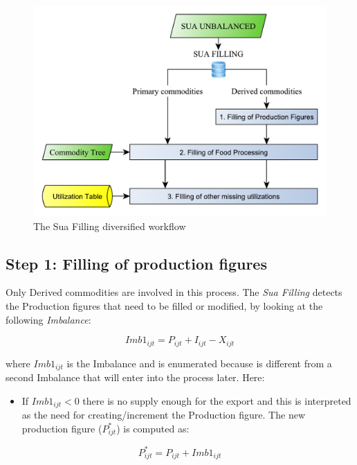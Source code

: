 \documentclass[]{article}
\providecommand{\tightlist}{%
  \setlength{\itemsep}{0pt}\setlength{\parskip}{0pt}}
\begin{document}
\begin{figure}

{\centering \includegraphics[width=0.65\linewidth]{images/StandBal/04b_SuaFilling2} 

}

\caption{\label{fig:f4}The Sua Filling diversified workflow}\label{fig:f4}
\end{figure}

\subsection*{Step 1: Filling of production
figures}\label{step-1-filling-of-production-figures}

Only Derived commodities are involved in this process. The \emph{Sua
Filling} detects the Production figures that need to be filled or
modified, by looking at the following \emph{Imbalance}:

\begin{equation}
\label{eq:imbalance1}
Imb1_{ijt} = P_{ijt} + I_{ijt} - X_{ijt}
\end{equation}

where \(Imb1_{ijt}\) is the Imbalance and is enumerated because is
different from a second Imbalance that will enter into the process
later. Here:

\begin{itemize}
\tightlist
\item
  If \(Imb1_{ijt} < 0\) there is no supply enough for the export and
  this is interpreted as the need for creating/increment the Production
  figure. The new production figure (\(P^*_{ijt}\)) is computed as:
\end{itemize}

\begin{equation}
\label{eq:imbalance1}
 P^*_{ijt} = P_{ijt} + Imb1_{ijt}
\end{equation}
\end{document}
